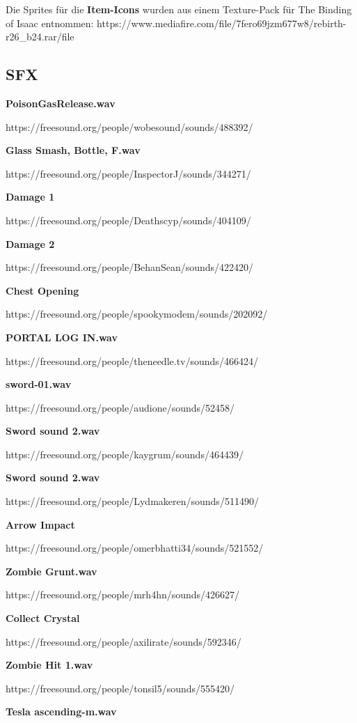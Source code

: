 Die Sprites für die \textbf{Item-Icons} wurden aus einem Texture-Pack für The Binding of Isaac entnommen: https://www.mediafire.com/file/7fero69jzm677w8/rebirth-r26\_b24.rar/file

\subsection{SFX}

\textbf{PoisonGasRelease.wav}

https://freesound.org/people/wobesound/sounds/488392/

\textbf{Glass Smash, Bottle, F.wav}

https://freesound.org/people/InspectorJ/sounds/344271/

\textbf{Damage 1}

https://freesound.org/people/Deathscyp/sounds/404109/

\textbf{Damage 2}

https://freesound.org/people/BehanSean/sounds/422420/

\textbf{Chest Opening}

https://freesound.org/people/spookymodem/sounds/202092/

\textbf{PORTAL LOG IN.wav}

https://freesound.org/people/theneedle.tv/sounds/466424/

\textbf{sword-01.wav}

https://freesound.org/people/audione/sounds/52458/

\textbf{Sword sound 2.wav}

https://freesound.org/people/kaygrum/sounds/464439/

\textbf{Sword sound 2.wav}

https://freesound.org/people/Lydmakeren/sounds/511490/

\textbf{Arrow Impact}

https://freesound.org/people/omerbhatti34/sounds/521552/

\textbf{Zombie Grunt.wav}

https://freesound.org/people/mrh4hn/sounds/426627/

\textbf{Collect Crystal}

https://freesound.org/people/axilirate/sounds/592346/

\textbf{Zombie Hit 1.wav}

https://freesound.org/people/tonsil5/sounds/555420/

\textbf{Tesla ascending-m.wav}

